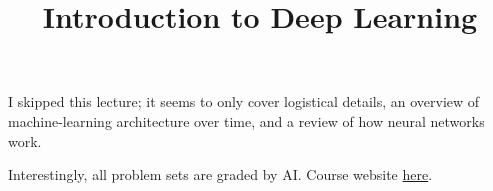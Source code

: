 \title{Introduction to Deep Learning}



I skipped this lecture;
it seems to only cover logistical details,
an overview of machine-learning architecture over time,
and a review of how neural networks work.

Interestingly, all problem sets are graded by AI.
Course website \href{https://deeplearning6-7960.github.io/}{here}.

